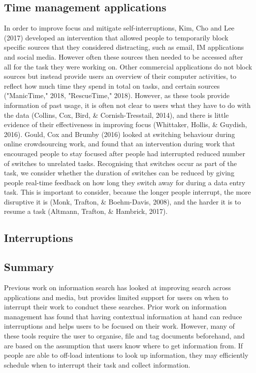 \subsection{Time management applications}
In order to improve focus and mitigate self-interruptions, Kim, Cho and Lee (2017) developed an intervention that allowed people to temporarily block specific sources that they considered distracting, such as email, IM applications and social media. However often these sources then needed to be accessed after all for the task they were working on. Other commercial applications do not block sources but instead provide users an overview of their computer activities, to reflect how much time they spend in total on tasks, and certain sources ("ManicTime," 2018, "RescueTime," 2018). However, as these tools provide information of past usage, it is often not clear to users what they have to do with the data (Collins, Cox, Bird, \& Cornish-Tresstail, 2014), and there is little evidence of their effectiveness in improving focus (Whittaker, Hollis, \& Guydish, 2016). Gould, Cox and Brumby (2016) looked at switching behaviour during online crowdsourcing work, and found that an intervention during work that encouraged people to stay focused after people had interrupted reduced number of switches to unrelated tasks. Recognising that switches occur as part of the task, we consider whether the duration of switches can be reduced by giving people real-time feedback on how long they switch away for during a data entry task. This is important to consider, because the longer people interrupt, the more disruptive it is (Monk, Trafton, \& Boehm-Davis, 2008), and the harder it is to resume a task (Altmann, Trafton, \& Hambrick, 2017).

\subsection{Interruptions}

\subsection{Summary}
Previous work on information search has looked at improving search across applications and media, but provides limited support for users on when to interrupt their work to conduct these searches. Prior work on information management has found that having contextual information at hand can reduce interruptions and helps users to be focused on their work. However, many of these tools require the user to organise, file and tag documents beforehand, and are based on the assumption that users know where to get information from. If people are able to off-load intentions to look up information, they may efficiently schedule when to interrupt their task and collect information.

